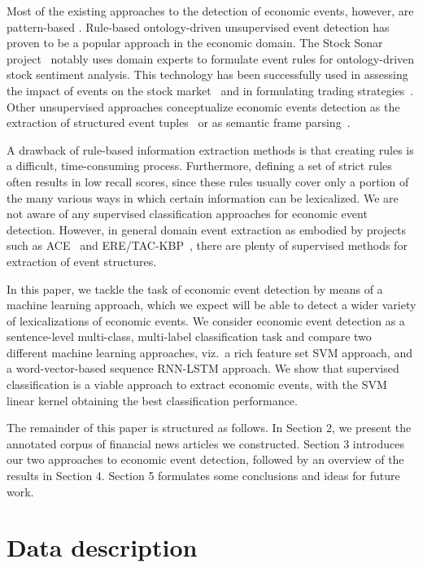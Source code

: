 \documentclass[11pt,a4paper]{article}
\begin{document}
Most of the existing approaches to the detection of economic events, however, are pattern-based \cite{Arendarenko2012, Hogenboom2013, du2016puls}.
Rule-based ontology-driven unsupervised event detection has proven to be a popular approach in the economic domain. The Stock Sonar project~\cite{feldman2011stock} notably uses domain experts to formulate event rules for ontology-driven stock sentiment analysis. 
This technology has been successfully used in assessing the impact of events on the stock market~\cite{boudoukh2016information} and in formulating trading strategies~\cite{ben2017event}. 
Other unsupervised approaches conceptualize economic events detection as the extraction of structured event tuples~\cite{Ding:2015:DLE:2832415.2832572} or as semantic frame parsing~\cite{xie2013semantic}.


A drawback of rule-based information extraction methods is that creating rules is a difficult, time-consuming process.
Furthermore, defining a set of strict rules often results in low recall scores, since these rules usually cover only a portion of the many various ways in which certain information can be lexicalized. 
We are not aware of any supervised classification approaches for economic event detection.
However, in general domain event extraction as embodied by projects such as ACE~\cite{ahn2006stages} and ERE/TAC-KBP~\cite{mitamura2016overview}, there are plenty of supervised methods for extraction of event structures.

In this paper, we tackle the task of economic event detection by means of a machine learning approach, which we expect will be able to detect a wider variety of lexicalizations of economic events.
We consider economic event detection as a sentence-level multi-class, multi-label classification task and compare two different machine learning approaches, viz.~a rich feature set SVM approach, and a  word-vector-based sequence RNN-LSTM approach. We show that supervised classification is a viable approach to extract economic events, with the SVM linear kernel obtaining the best classification performance.

The remainder of this paper is structured as follows. In Section 2, we present the annotated corpus of financial news
articles we constructed.
Section 3 introduces our two approaches to economic event detection, followed by an overview of the results in Section 4.
Section 5 formulates some conclusions and ideas for future work.


\section{Data description}
\end{document}
